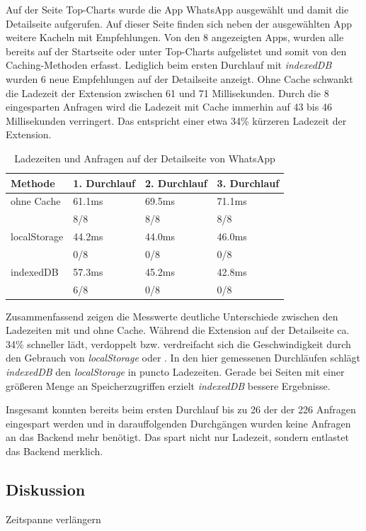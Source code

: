 Auf der Seite \glqq Top-Charts \grqq{} wurde die App \glqq WhatsApp \grqq{} ausgewählt und damit die Detailseite aufgerufen. Auf dieser Seite finden sich neben der ausgewählten App weitere Kacheln mit Empfehlungen. Von den 8 angezeigten Apps, wurden alle bereits auf der Startseite oder unter \glqq Top-Charts \grqq{} aufgelistet und somit von den Caching-Methoden erfasst. Lediglich beim ersten Durchlauf mit \textit{indexedDB} wurden 6 neue Empfehlungen auf der Detailseite anzeigt. Ohne Cache schwankt die Ladezeit der Extension zwischen 61 und 71 Millisekunden. Durch die 8 eingesparten Anfragen wird die Ladezeit mit Cache immerhin auf 43 bis 46 Millisekunden verringert. Das entspricht einer etwa 34\% kürzeren Ladezeit der Extension.
\begin{table}[h]
	\begin{tabular}{p{2.8cm}C{3.0cm}C{2.8cm}C{3.0cm}}
		\toprule
		\textbf{Methode}	&	\textbf{1. Durchlauf}	&	\textbf{2. Durchlauf}	& \textbf{3. Durchlauf}\\
		\midrule
		ohne Cache	&	61.1ms	&	69.5ms	&	71.1ms	\\
		&	8/8	&	8/8	&	8/8	\\
		
		localStorage	&	44.2ms	&	44.0ms	&	46.0ms	\\
		&	0/8		&	0/8	&	0/8	\\
		
		indexedDB	&	57.3ms	&	45.2ms	&	42.8ms	\\
		&	6/8	&	0/8	&	0/8	\\
		
		\bottomrule
	\end{tabular}
	\caption{Ladezeiten und Anfragen auf der Detailseite von \glqq WhatsApp \grqq{}}
	\label{ergebnis33}
\end{table}

Zusammenfassend zeigen die Messwerte deutliche Unterschiede zwischen den Ladezeiten mit und ohne Cache. Während die Extension auf der Detailseite ca. 34\% schneller lädt, verdoppelt bzw. verdreifacht sich die Geschwindigkeit durch den Gebrauch von \textit{localStorage} oder . In den hier gemessenen Durchläufen schlägt \textit{indexedDB} den \textit{localStorage} in puncto Ladezeiten. Gerade bei Seiten mit einer größeren Menge an Speicherzugriffen erzielt \textit{indexedDB} bessere Ergebnisse.

Insgesamt konnten bereits beim ersten Durchlauf bis zu 26 der der 226 Anfragen eingespart werden und in darauffolgenden Durchgängen wurden keine Anfragen an das Backend mehr benötigt. Das spart nicht nur Ladezeit, sondern entlastet das Backend merklich.

\subsection{Diskussion}
\label{ss:diskussionht2}

Zeitspanne verlängern